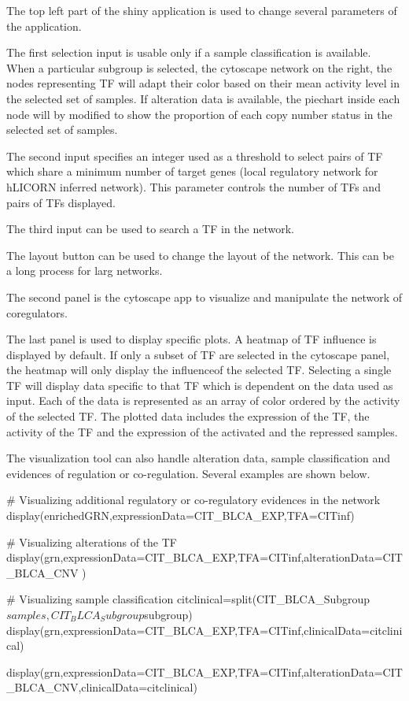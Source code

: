 \documentclass[12pt]{article}
\begin{document}
The top left part of the shiny application is used to change several
parameters of the application.


The first selection input is usable only if a sample classification is
available. When a particular subgroup is selected, the cytoscape network
on the right, the nodes representing TF will adapt their color based on
their mean activity level in the selected set of samples. If alteration
data is available, the piechart inside each node will by modified to
show the proportion of each copy number status in the selected set of
samples.

The second input specifies an integer used as a threshold to select
pairs of TF which share a minimum number of target genes (local
regulatory network for hLICORN inferred network). This parameter
controls the number of TFs and pairs of TFs displayed.

The third input can be used to search a TF in the network.

The layout button can be used to change the layout of the network. This
can be a long process for larg networks.

The second panel is the cytoscape app to visualize and manipulate the
network of coregulators.

The last panel is used to display specific plots. A heatmap of TF
influence is displayed by default. If only a subset of TF are selected
in the cytoscape panel, the heatmap will only display the influenceof
the selected TF. Selecting a single TF will display data specific to
that TF which is dependent on the data used as input. Each of the data
is represented as an array of color ordered by the activity of the
selected TF. The plotted data includes the expression of the TF, the
activity of the TF and the expression of the activated and the repressed
samples.

The visualization tool can also handle alteration data, sample
classification and evidences of regulation or co-regulation. Several
examples are shown below.

 \begin{Schunk}
\begin{Sinput}
    # Visualizing additional regulatory or co-regulatory evidences in the network
    display(enrichedGRN,expressionData=CIT_BLCA_EXP,TFA=CITinf)

    # Visualizing alterations of the TF
    display(grn,expressionData=CIT_BLCA_EXP,TFA=CITinf,alterationData=CIT_BLCA_CNV )

    # Visualizing sample classification
    citclinical=split(CIT_BLCA_Subgroup$samples,CIT_BLCA_Subgroup$subgroup)
    display(grn,expressionData=CIT_BLCA_EXP,TFA=CITinf,clinicalData=citclinical)


    display(grn,expressionData=CIT_BLCA_EXP,TFA=CITinf,alterationData=CIT_BLCA_CNV,clinicalData=citclinical)
\end{Sinput}
\end{Schunk}
\end{document}
